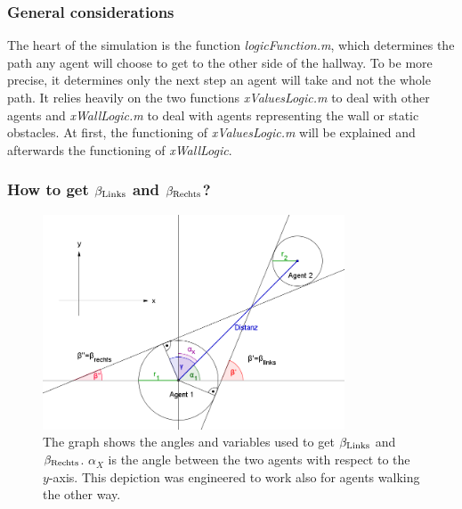 
\subsubsection{General considerations}
The heart of the simulation is the function \textit{logicFunction.m}, which determines the path any agent will choose to get to the other side of the hallway. To be more precise, it determines only the next step an agent will take and not the whole path. It relies heavily on the two functions \textit{xValuesLogic.m} to deal with other agents and \textit{xWallLogic.m} to deal with agents representing the wall or static obstacles. At first, the functioning of \textit{xValuesLogic.m} will be explained and afterwards the functioning of \textit{xWallLogic}.\\

\subsubsection{How to get $\beta_{\text{Links}}$ and $\beta_{\text{Rechts}}$?}
\begin{figure}[h!]
	\centering
		\includegraphics[width=0.80\textwidth]{pictures/beta.PNG}
	\caption{The graph shows the angles and variables used to get $\beta_{\text{Links}}$ and $\beta_{\text{Rechts}}$. $\alpha_X$ is the angle between the two agents with respect to the $y$-axis. This depiction was engineered to work also for agents walking the other way.}
	\label{fig:beta}
\end{figure}

